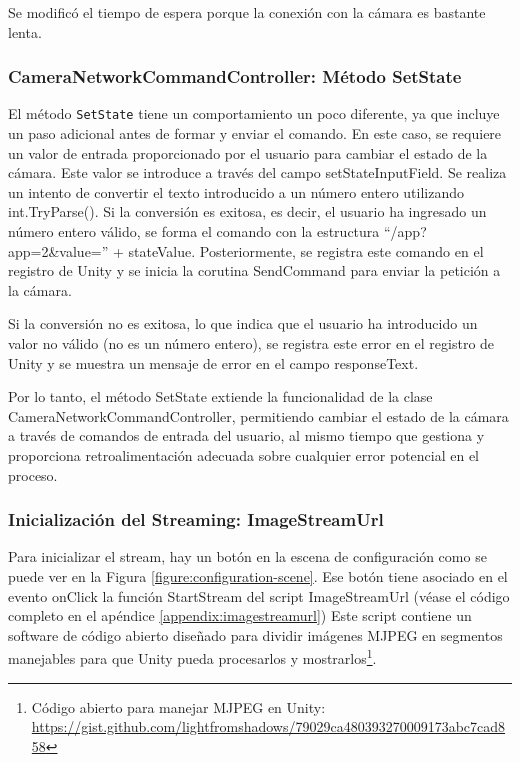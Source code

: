 Se modificó el tiempo de espera porque la conexión con la cámara es bastante lenta.

\subsubsection{CameraNetworkCommandController: Método SetState}

El método \lstinline{SetState} tiene un comportamiento un poco diferente, ya que incluye un paso adicional antes de formar y enviar el comando. En este caso, se requiere un valor de entrada proporcionado por el usuario para cambiar el estado de la cámara. Este valor se introduce a través del campo setStateInputField. Se realiza un intento de convertir el texto introducido a un número entero utilizando int.TryParse(). Si la conversión es exitosa, es decir, el usuario ha ingresado un número entero válido, se forma el comando con la estructura ``/app?app=2\&value='' + stateValue. Posteriormente, se registra este comando en el registro de Unity y se inicia la corutina SendCommand para enviar la petición a la cámara.



Si la conversión no es exitosa, lo que indica que el usuario ha introducido un valor no válido (no es un número entero), se registra este error en el registro de Unity y se muestra un mensaje de error en el campo responseText.



Por lo tanto, el método SetState extiende la funcionalidad de la clase CameraNetworkCommandController, permitiendo cambiar el estado de la cámara a través de comandos de entrada del usuario, al mismo tiempo que gestiona y proporciona retroalimentación adecuada sobre cualquier error potencial en el proceso.


\subsubsection{Inicialización del Streaming: ImageStreamUrl}
Para inicializar el stream, hay un botón en la escena de configuración como se puede ver en la Figura \ref{figure:configuration-scene}. Ese botón tiene asociado en el evento onClick la función StartStream del script ImageStreamUrl (véase el código completo en el apéndice \ref{appendix:imagestreamurl}) Este script contiene un software de código abierto diseñado para dividir imágenes MJPEG en segmentos manejables para que Unity pueda procesarlos y mostrarlos\footnote{Código abierto para manejar MJPEG en Unity: \url{https://gist.github.com/lightfromshadows/79029ca480393270009173abc7cad858}}.


